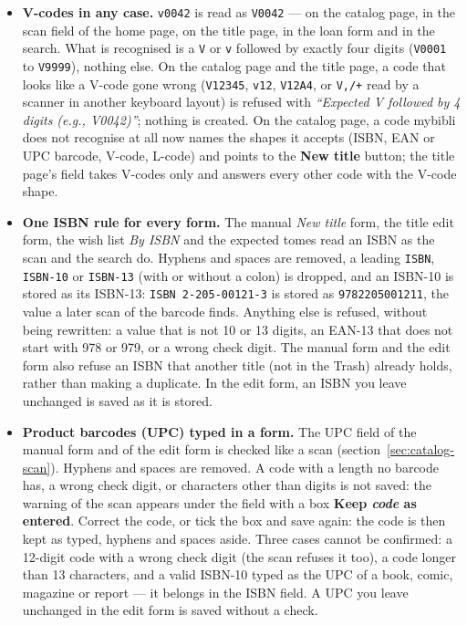 \begin{itemize}
  \item \textbf{V-codes in any case.} \texttt{v0042} is read as
        \texttt{V0042} --- on the catalog page, in the scan field of the
        home page, on the title page, in the loan form and in the
        search. What is
        recognised is a \texttt{V} or \texttt{v} followed by exactly four
        digits (\texttt{V0001} to \texttt{V9999}), nothing else. On the
        catalog page and the title page, a code that looks like a V-code
        gone wrong (\texttt{V12345}, \texttt{v12}, \texttt{V12A4}, or
        \texttt{V,/+} read by a scanner in another keyboard layout) is
        refused with \emph{``Expected V followed by 4 digits (e.g.,
        V0042)''}; nothing is created. On the catalog page, a code mybibli
        does not recognise at all now names the shapes it accepts (ISBN, EAN or UPC barcode,
        V-code, L-code) and points to the \textbf{New title} button;
        the title page's field takes V-codes only and answers every
        other code with the V-code shape.
  \item \textbf{One ISBN rule for every form.} The manual
        \emph{New title} form, the title edit form, the wish list
        \emph{By ISBN} and the expected tomes read an ISBN as the scan
        and the search do. Hyphens and spaces are removed, a leading
        \texttt{ISBN}, \texttt{ISBN-10} or \texttt{ISBN-13} (with or
        without a colon) is dropped, and an ISBN-10 is stored as its
        ISBN-13: \texttt{ISBN 2-205-00121-3} is stored as
        \texttt{9782205001211}, the value a later scan of the barcode
        finds. Anything else is refused, without being
        rewritten: a value that is not 10 or 13 digits, an EAN-13 that
        does not start with 978 or 979, or a wrong check digit. The
        manual form and the edit form also refuse an ISBN that another
        title (not in the Trash) already holds, rather than making a
        duplicate. In the edit form, an ISBN you leave unchanged is
        saved as it is stored.
  \item \textbf{Product barcodes (UPC) typed in a form.} The UPC field
        of the manual form and of the edit form is checked like a scan
        (section~\ref{sec:catalog-scan}). Hyphens and spaces are
        removed. A code with a length no barcode has, a wrong check
        digit, or characters other than digits is not saved: the warning
        of the scan appears under the field with a box \textbf{Keep
        \emph{code} as entered}. Correct the code, or tick the box and
        save again: the code is then kept as typed, hyphens and spaces
        aside. Three cases
        cannot be confirmed: a 12-digit code with a wrong check digit
        (the scan refuses it too), a code longer than 13 characters, and a
        valid ISBN-10 typed as the UPC of a book, comic, magazine or
        report --- it belongs in the ISBN field. A UPC you leave
        unchanged in the edit form is saved without a check.
\end{itemize}

